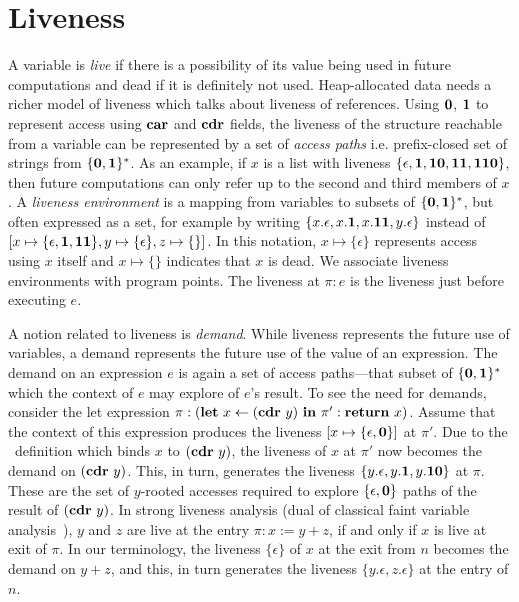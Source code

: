\documentclass[9pt]{sigplanconf}
\begin{document}
\renewcommand{\pp}[2]{\ensuremath{#1\!\!:\!#2}} %



\section{Liveness}\label{sec:liveness}

A variable is {\em live} if there  is a possibility of its value being
used in  future computations and  dead if  it is definitely  not used.
Heap-allocated data needs a richer model of liveness which talks about
liveness of  references.  Using  $\mathbf{0}$, $\mathbf{1}$ to  represent access
using  $\mbox{$\mathbf{car}$}$  and  $\mbox{$\mathbf{cdr}$}$  fields,  the  liveness  of  the  structure
reachable from a  variable can be represented by a  set of {\em access
  paths}     i.e.     prefix-closed     set     of    strings     from
$\{\mathbf{0},\mathbf{1}\}^\ast$.  As an example, if $x$ is a list with liveness
$\{\epsilon, \mathbf{1},  \mathbf{1}\mathbf{0}, \mathbf{1}\mathbf{1},  \mathbf{1}\mathbf{1}\mathbf{0}\}$, then
future computations can only refer up  to the second and third members
of $x$.  A  {\em liveness environment} is a mapping  from variables to
subsets of $\{\mathbf{0},\mathbf{1}\}^\ast$,  but often expressed as  a set, for
example by writing $\{x.\epsilon, x.\mathbf{1}, x.\mathbf{1}\mathbf{1}, y.\epsilon\}$
instead       of       $[x       \mapsto\{\epsilon,\mathbf{1},\mathbf{1}\mathbf{1}\},
  y\mapsto\{\epsilon\}, z\mapsto\{\}]$.  In  this notation, $x \mapsto
\{\epsilon\}$ represents access using $x$  itself and $x \mapsto \{\}$
indicates that $x$  is dead.  We associate  liveness environments with
program points.  The  liveness at $\pi:e$ is the  liveness just before
executing $e$.


A  notion  related  to  liveness  is  {\em  demand}.   While  liveness
represents the future use of variables, a demand represents the future
use of the value of an expression.  The demand on an expression $e$ is
again a  set of  access paths---that subset  of $\{\mathbf{0},\mathbf{1}\}^\ast$
which the context of $e$ may explore of $e$'s result.  To see the need
for  demands,  consider   the  let  expression  $\pi:(\mbox{$\mathbf{ let}$}~x\leftarrow
(\mbox{$\mathbf{cdr}$}~y)~\mbox{$\mathbf{ in}$}~  \pi':\mbox{$\mathbf{ return}$}~x)$.  Assume  that  the  context of  this
expression produces  the liveness $[x \mapsto  \lbrace \epsilon, \mathbf{0}
  \rbrace]$ at $\pi'$.  Due to the \LET\ definition which binds $x$ to
$(\mbox{$\mathbf{cdr}$}~y)$, the  liveness of $x$ at  $\pi'$ now becomes the  demand on
$(\mbox{$\mathbf{cdr}$}~y)$.    This,  in   turn,  generates   the  liveness   $\lbrace
y.\epsilon, y.\mathbf{1}, y.\mathbf{1}\mathbf{0} \rbrace$ at $\pi$. These are the set
of $y$-rooted  accesses required  to explore $\lbrace  \epsilon, \mathbf{0}
\rbrace$  paths  of  the  result of  $(\mbox{$\mathbf{cdr}$}~y)$.  In  strong  liveness
analysis       (dual      of       classical      faint       variable
analysis~\cite{horwitz.faint}),  $y$ and  $z$  are live  at the  entry
$\pi: x:=y+z$, if  and only if $x$  is live at exit of  $\pi$.  In our
terminology, the  liveness $\lbrace  \epsilon\rbrace $  of $x$  at the
exit from $n$ becomes the demand on $y+z$, and this, in turn generates
the liveness $\lbrace y.\epsilon, z.\epsilon  \rbrace$ at the entry of
$n$.
\end{document}

